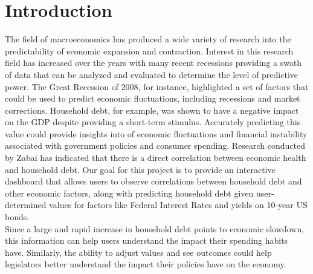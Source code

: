 \documentclass[sigconf,nonacm,11pt]{acmart}
\begin{document}
\section{Introduction}

The field of macroeconomics has produced a wide variety of research into the predictability of economic expansion and contraction. Interest in this research field has increased over the years with many recent recessions providing a swath of data that can be analyzed and evaluated to determine the level of predictive power. The Great Recession of 2008, for instance, highlighted a set of factors that could be used to predict economic fluctuations, including recessions and market corrections.  Household debt, for example, was shown to have a negative impact on the GDP despite providing a short-term stimulus\cite{Kim2016}.  Accurately predicting this value could provide insights into of economic fluctuations and financial instability associated with government policies and consumer spending.  Research conducted by Zabai\cite{Zabai2017} has indicated that there is a direct correlation between economic health and household debt. Our goal for this project is to provide an interactive dashboard that allows users to observe correlations between household debt and other economic factors, along with predicting household debt given user-determined values for factors like Federal Interest Rates and yields on 10-year US bonds.\\
Since a large and rapid increase in household debt points to economic slowdown\cite{Mian2018}, this information can help users understand the impact their spending habits have. Similarly, the ability to adjust values and see outcomes could help legislators better understand the impact their policies have on the economy\cite{Garber2018}.\vspace{-1em}


\end{document}
